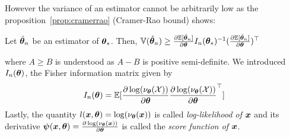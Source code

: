 However the variance of an estimator cannot be arbitrarily low as the
proposition~\ref{prop:cramerrao} (Cramer-Rao bound) shows:
\begin{prop}
  \label{prop:cramerrao}
  Let $\hat{\boldsymbol{\theta}}_n$ be an estimator of $\boldsymbol{\theta}_*$.
  Then, $\mathbb{V}(\hat{\boldsymbol{\theta}}_n) \geq
  \frac{ \partial \mathbb{E}[\hat{\boldsymbol{\theta}}_n]}{\partial \boldsymbol{\theta}}I_n(\boldsymbol{\theta}_*)^{-1} (\frac{ \partial \mathbb{E}[\hat{\boldsymbol{\theta}}_n]}{\partial \boldsymbol{\theta}})^{\top}$
\end{prop}
where $A \geq B$ is understood as $A-B$ is positive semi-definite.
We introduced $I_n(\boldsymbol{\theta})$, the Fisher information matrix given by
\begin{align}
  I_n(\boldsymbol{\theta}) = \mathbb{E}[\frac{ \partial \log(\nu_{\boldsymbol{\theta}}(\mathcal{X}))}{\partial \boldsymbol{\theta}} \frac{ \partial \log(\nu_{\boldsymbol{\theta}}(\mathcal{X}))}{\partial \boldsymbol{\theta}}^{\top}]
\end{align}
Lastly, the quantity $l(\boldsymbol{x}, \boldsymbol{\theta}) = \log(\nu_{\boldsymbol{\theta}}(\boldsymbol{x}))$ is called
\emph{log-likelihood of $\boldsymbol{x}$} and its derivative $\boldsymbol{\psi}(\boldsymbol{x}, \boldsymbol{\theta}) =
\frac{ \partial \log(\nu_{\boldsymbol{\theta}}(\boldsymbol{x}))}{\partial \boldsymbol{\theta}}$ is called the \emph{score
  function of $\boldsymbol{x}$}. 
